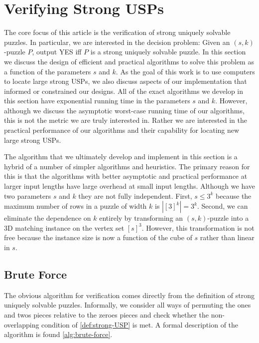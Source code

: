 \documentclass[11pt]{article}
\begin{document}
\section{Verifying Strong USPs}
\label{sec:verify}

The core focus of this article is the verification of strong
uniquely solvable puzzles.  In particular, we are interested in the
decision problem: Given an $(s,k)$-puzzle $P$, output YES iff $P$ is a
strong uniquely solvable puzzle.  In this section we discuss the
design of efficient and practical algorithms to solve this problem as
a function of the parameters $s$ and $k$.  As the goal of this work is
to use computers to locate large strong USPs, we also discuss aspects
of our implementation that informed or constrained our designs.  All
of the exact algorithms we develop in this section have exponential
running time in the parameters $s$ and $k$.  However, although we
discuss the asymptotic worst-case running time of our algorithms, this
is not the metric we are truly interested in.  Rather we are
interested in the practical performance of our algorithms and their
capability for locating new large strong USPs.

The algorithm that we ultimately develop and implement in this section
is a hybrid of a number of simpler algorithms and heuristics.  The
primary reason for this is that the algorithms with better asymptotic
and practical performance at larger input lengths have large overhead
at small input lengths.  Although we have two parameters $s$ and $k$
they are not fully independent.  First, $s \le 3^k$ because the
maximum number of rows in a puzzle of width $k$ is $|[3]^k| = 3^k$.
Second, we can eliminate the dependence on $k$ entirely by
transforming an $(s,k)$-puzzle into a 3D matching instance on the
vertex set $[s]^3$.  However, this transformation is not free because
the instance size is now a function of the cube of $s$ rather than
linear in $s$.

\subsection{Brute Force}

The obvious algorithm for verification comes directly from the
definition of strong uniquely solvable puzzles.  Informally, we
consider all ways of permuting the ones and twos pieces relative to
the zeroes pieces and check whether the non-overlapping condition of
\autoref{def:strong-USP} is met.  A formal description of the
algorithm is found \autoref{alg:brute-force}.
\end{document}
